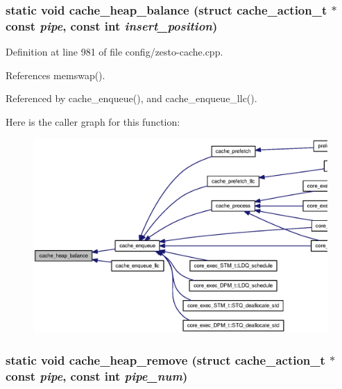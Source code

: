 \subsubsection[{cache\_\-heap\_\-balance}]{\setlength{\rightskip}{0pt plus 5cm}static void cache\_\-heap\_\-balance (struct {\bf cache\_\-action\_\-t} $\ast$const  {\em pipe}, \/  const int {\em insert\_\-position})\hspace{0.3cm}{\tt  [static]}}\label{config_2zesto-cache_8cpp_0784d914ca0e1dc0f651a456830f94ed}




Definition at line 981 of file config/zesto-cache.cpp.

References memswap().

Referenced by cache\_\-enqueue(), and cache\_\-enqueue\_\-llc().

Here is the caller graph for this function:\nopagebreak
\begin{figure}[H]
\begin{center}
\leavevmode
\includegraphics[width=420pt]{config_2zesto-cache_8cpp_0784d914ca0e1dc0f651a456830f94ed_icgraph}
\end{center}
\end{figure}
\subsubsection[{cache\_\-heap\_\-remove}]{\setlength{\rightskip}{0pt plus 5cm}static void cache\_\-heap\_\-remove (struct {\bf cache\_\-action\_\-t} $\ast$const  {\em pipe}, \/  const int {\em pipe\_\-num})\hspace{0.3cm}{\tt  [static]}}\label{config_2zesto-cache_8cpp_672e06f81a893ac6af2c4fd4948069ed}




